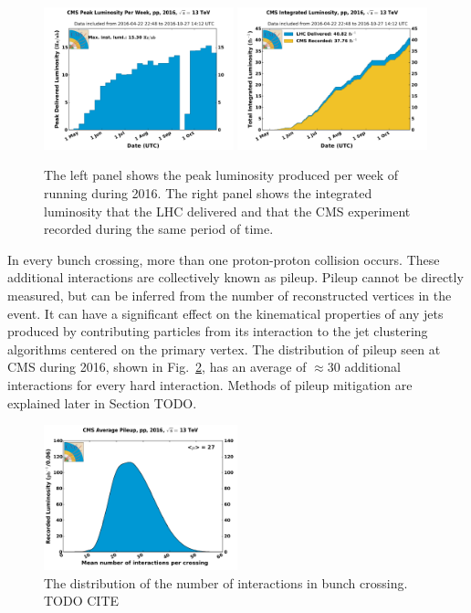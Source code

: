 \begin{figure}[htpb!]
	\centering
	\includegraphics[width=0.49\textwidth]{Figures/CMS2016PeakLumi}
	\includegraphics[width=0.49\textwidth]{Figures/LHC2016Lumi}
	\caption[The left panel shows the peak luminosity produced per week of running during 2016. The right panel shows the integrated luminosity that the LHC delivered and CMS recorded during the same period of time.]{The left panel shows the peak luminosity produced per week of running during 2016. The right panel shows the integrated luminosity that the LHC delivered and that the CMS experiment recorded during the same period of time. }
	\label{fig:CMSLumi}
\end{figure}

In every bunch crossing, more than one proton-proton collision occurs.
These additional interactions are collectively known as pileup.
Pileup cannot be directly measured, but can be inferred from the number of reconstructed vertices in the event.
It can have a significant effect on the kinematical properties of any jets produced by contributing particles from its interaction to the jet clustering algorithms centered on the primary vertex.
The distribution of pileup seen at CMS during 2016, shown in Fig.~\ref{fig:CMSPU}, has an average of $\approx30$ additional interactions for every hard interaction.
Methods of pileup mitigation are explained later in Section TODO.
\begin{figure}[htpb]
	\centering
	\includegraphics[width=0.5\textwidth]{Figures/CMSAvePU}
	\caption[The distribution of the number of interactions in bunch crossing]{The distribution of the number of interactions in bunch crossing. TODO CITE }
	\label{fig:CMSPU}
\end{figure}

